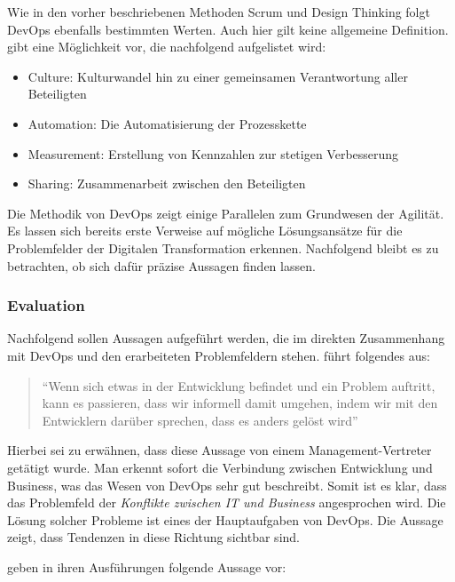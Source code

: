 Wie in den vorher beschriebenen Methoden Scrum und Design Thinking folgt DevOps ebenfalls bestimmten Werten. Auch hier gilt keine allgemeine Definition.  gibt eine Möglichkeit vor, die nachfolgend aufgelistet wird:

\begin{itemize}[noitemsep, topsep=0pt]
	\item Culture: Kulturwandel hin zu einer gemeinsamen Verantwortung aller Beteiligten
	\item Automation: Die Automatisierung der Prozesskette
	\item Measurement: Erstellung von Kennzahlen zur stetigen Verbesserung
	\item Sharing: Zusammenarbeit zwischen den Beteiligten
\end{itemize}

Die Methodik von DevOps zeigt einige Parallelen zum Grundwesen der Agilität. Es lassen sich bereits erste Verweise auf mögliche Lösungsansätze für die Problemfelder der Digitalen Transformation erkennen. Nachfolgend bleibt es zu betrachten, ob sich dafür präzise Aussagen finden lassen. 

\subsubsection{Evaluation}

Nachfolgend sollen Aussagen aufgeführt werden, die  im direkten Zusammenhang mit DevOps und den erarbeiteten Problemfeldern stehen.  führt folgendes aus:

\begin{quote}
	``Wenn sich etwas in der Entwicklung befindet und ein Problem auftritt, kann es passieren, dass wir informell damit umgehen, indem wir mit den Entwicklern darüber sprechen, dass es anders gelöst wird'' \cite[S. 6]{mikalsen_agile_2018}
\end{quote}

Hierbei sei zu erwähnen, dass diese Aussage von einem Management-Vertreter getätigt wurde. Man erkennt sofort die Verbindung zwischen Entwicklung und Business, was das Wesen von DevOps sehr gut beschreibt. Somit ist es klar, dass das Problemfeld der \textit{Konflikte zwischen IT und Business} angesprochen wird. Die Lösung solcher Probleme ist eines der Hauptaufgaben von DevOps. Die Aussage zeigt, dass Tendenzen in diese Richtung sichtbar sind.

 geben in ihren Ausführungen folgende Aussage vor:

